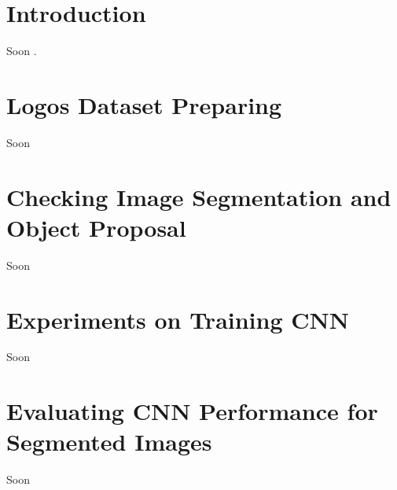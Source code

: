 \section{Introduction}\label{sec:5.1}
\vspace{-0.5cm}
\noindent Soon \cite{Duttweiler}.

\vspace{-0.3cm}

\section{Logos Dataset Preparing}\label{sec:5.2}
\vspace{-0.5cm}
\noindent Soon

\vspace{-0.3cm}

\section{Checking Image Segmentation and Object Proposal}\label{sec:5.3}
\vspace{-0.5cm}
\noindent Soon

\vspace{-0.3cm}

\section{Experiments on Training CNN}\label{sec:5.4}
\vspace{-0.5cm}
\noindent Soon

\vspace{-0.3cm}

\section{Evaluating CNN Performance for Segmented Images}\label{sec:5.5}
\vspace{-0.5cm}
\noindent Soon

\vspace{-0.3cm}

